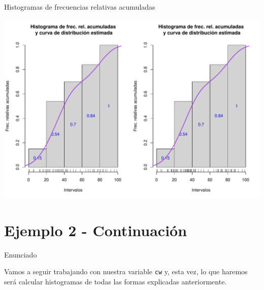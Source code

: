 \documentclass[
  ignorenonframetext,
]{beamer}
\begin{document}
\begin{frame}{Histogramas de frecuencias relativas acumuladas}
\protect\hypertarget{histogramas-de-frecuencias-relativas-acumuladas-2}{}

\includegraphics{Tema9.-Agrupacion_datos_cuantitativos_files/figure-beamer/unnamed-chunk-51-1.pdf}

\end{frame}

\hypertarget{ejemplo-2---continuaciuxf3n-1}{%
\section{Ejemplo 2 - Continuación}\label{ejemplo-2---continuaciuxf3n-1}}

\begin{frame}[fragile]{Enunciado}
\protect\hypertarget{enunciado-4}{}

Vamos a seguir trabajando con nuestra variable \texttt{cw} y, esta vez,
lo que haremos será calcular histogramas de todas las formas explicadas
anteriormente.

\end{frame}
\end{document}
